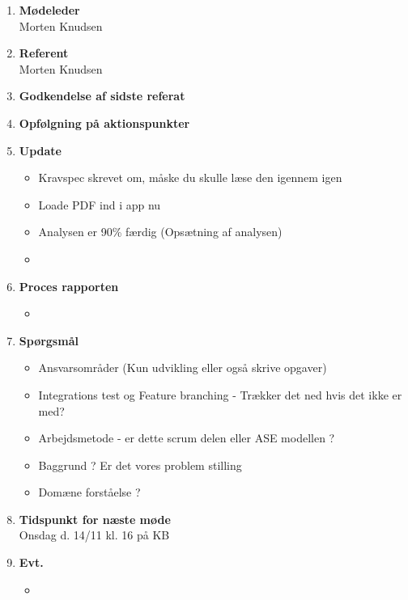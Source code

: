 	\begin{enumerate}
		\itemsep 0.3em 
		\item \textbf{Mødeleder}\\
			Morten Knudsen
		\item \textbf{Referent}\\
			Morten Knudsen
		\item \textbf{Godkendelse af sidste referat}
			
		\item\textbf{Opfølgning på aktionspunkter}

		\item \textbf{Update}
			\begin{itemize}[-]
				\item Kravspec skrevet om, måske du skulle læse den igennem igen
				\item Loade PDF ind i app nu
				\item Analysen er 90\% færdig (Opsætning af analysen)
				\item 
				
			\end{itemize}
	
		\item \textbf{Proces rapporten}
		\begin{itemize}[-]
			\item 
			
		\end{itemize}
		
		\item \textbf{Spørgsmål}
			\begin{itemize}[-]
				\item Ansvarsområder (Kun udvikling eller også skrive opgaver)
				\item Integrations test og Feature branching - Trækker det ned hvis det ikke er med?
				\item Arbejdsmetode - er dette scrum delen eller ASE modellen ?
				\item Baggrund ? Er det vores problem stilling
				\item Domæne forståelse ?
			\end{itemize}
	
		\item \textbf{Tidspunkt for næste møde} \\
			Onsdag d. 14/11 kl. 16 på KB
			
		\item \textbf{Evt.}
			\begin{itemize}[-]
				\item 
			\end{itemize}
			
	\end{enumerate}
